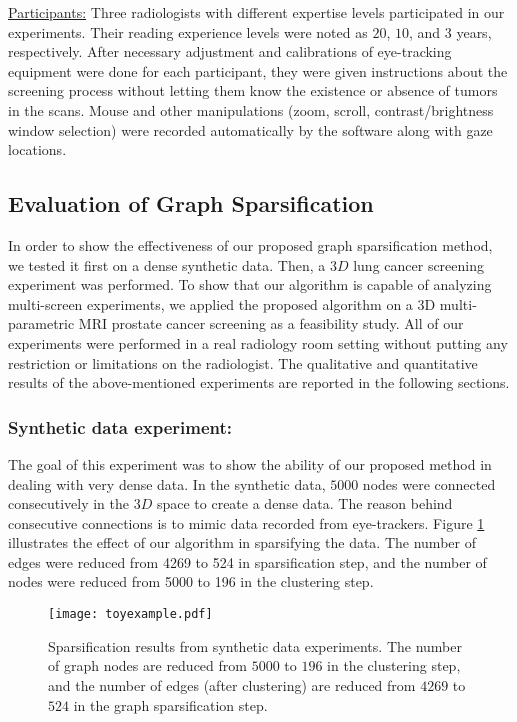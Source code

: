 \documentclass[preprint,12pt]{elsarticle}
\begin{document}
\underline{Participants:} Three radiologists with different expertise levels participated in our experiments. Their reading experience levels were noted as $20$, $10$, and $3$ years, respectively. After necessary adjustment and calibrations of eye-tracking equipment were done for each participant, they were given instructions about the screening process without letting them know the existence or absence of tumors in the scans. Mouse and other manipulations (zoom, scroll, contrast/brightness window selection) were recorded automatically by the software along with gaze locations.

\subsection{Evaluation of Graph Sparsification}
In order to show the effectiveness of our proposed graph sparsification method, we tested it first on a dense synthetic data. Then, a $3D$ lung cancer screening experiment was performed. To show that our algorithm is capable of analyzing multi-screen experiments, we applied the proposed algorithm on a 3D multi-parametric MRI prostate cancer screening as a feasibility study. All of our experiments were performed in a real radiology room setting without putting any restriction or limitations on the radiologist. The qualitative and quantitative results of the above-mentioned experiments are reported in the following sections.

\subsubsection{Synthetic data experiment:} The goal of this experiment was to show the ability of our proposed method in dealing with very dense data. In the synthetic data, $5000$ nodes were connected consecutively in the $3D$ space to create a dense data. The reason behind consecutive connections is to mimic data recorded from eye-trackers. Figure \ref{fig:toy3d} illustrates the effect of our algorithm in sparsifying the data. The number of edges were reduced from 4269 to 524 in sparsification step, and the number of nodes were reduced from 5000 to 196 in the clustering step.

\begin{figure}[h]
\centering
\texttt{[image: toyexample.pdf]}
\caption{Sparsification results from synthetic data experiments. The number of graph nodes are reduced from $5000$ to $196$ in the clustering step, and the number of edges (after clustering) are reduced from $4269$ to $524$ in the graph sparsification step. \label{fig:toy3d}}
\end{figure}
\end{document}
